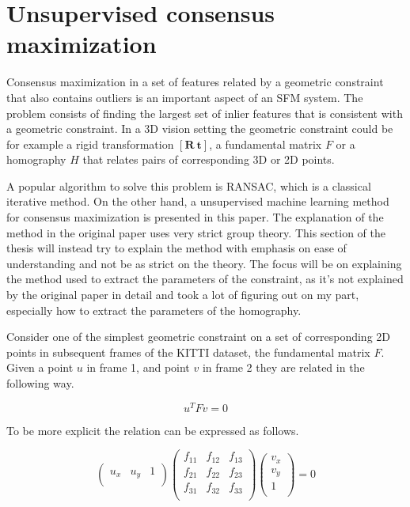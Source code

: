 \section{Unsupervised consensus maximization}

Consensus maximization in a set of features related by a geometric constraint that also contains outliers is an important aspect of an SFM system. The problem consists of finding the largest set of inlier features that is consistent with a geometric constraint. In a 3D vision setting the geometric constraint could be for example a rigid transformation $[\textbf{R}\ \textbf{t}]$, a fundamental matrix $F$ or a homography $H$ that relates pairs of corresponding 3D or 2D points.

A popular algorithm to solve this problem is RANSAC\cite{ransac}, which is a classical iterative method. On the other hand, a unsupervised machine learning method for consensus maximization is presented in this paper\cite{consensus}. The explanation of the method in the original paper uses very strict group theory. This section of the thesis will instead try to explain the method with emphasis on ease of understanding and not be as strict on the theory. The focus will be on explaining the method used to extract the parameters of the constraint, as it's not explained by the original paper in detail and took a lot of figuring out on my part, especially how to extract the parameters of the homography.

Consider one of the simplest geometric constraint on a set of corresponding 2D points in subsequent frames of the KITTI dataset, the fundamental matrix $F$. Given a point $u$ in frame 1, and point $v$ in frame 2 they are related in the following way.

 \[
 u^T F v = 0
 \]
 
 To be more explicit the relation can be expressed as follows.
 
\[
\begin{pmatrix}
u_x & u_y & 1 \\
\end{pmatrix}
\begin{pmatrix}
f_{11} & f_{12} & f_{13} \\
f_{21} & f_{22} & f_{23} \\
f_{31} & f_{32} & f_{33} \\
\end{pmatrix}
\begin{pmatrix}
v_x \\
v_y \\
1 \\
\end{pmatrix}
= 0
\]

